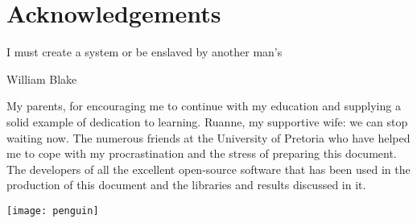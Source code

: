 \chapter*{Acknowledgements}
\epigraph{I must create a system or be enslaved by another man's}{William Blake}

My parents, for encouraging me to continue with my education and supplying a solid example of dedication to learning.
Ruanne, my supportive wife: we can stop waiting now.
The numerous friends at the University of Pretoria who have helped me to cope with my procrastination and the stress of preparing this document.
The developers of all the excellent open-source software that has been used in the production of this document and the libraries and results discussed in it.

\vfil

\begin{flushright}
  \texttt{[image: penguin]} 
\end{flushright}

